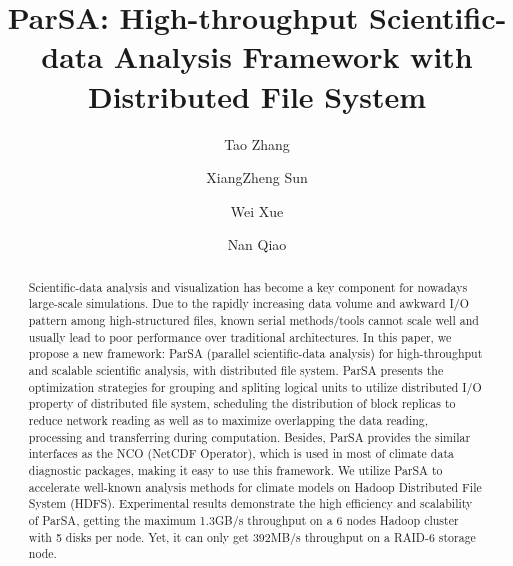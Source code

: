 \documentclass[preprint,12pt]{elsarticle}
\begin{document}
\begin{frontmatter}



\title{ParSA: High-throughput Scientific-data Analysis Framework with Distributed File System}



\author[1]{Tao Zhang}
\author[2]{XiangZheng Sun}
\author[1]{Wei Xue}
\author[2]{Nan Qiao}
\address[1]{Department of Computer Science and Technology, Tsinghua University, Beijing, China}
\address[2]{Intel Corporation, Beijing, China}

\begin{abstract}
Scientific-data analysis and visualization has become a key component for nowadays large-scale simulations. Due to the rapidly
increasing data volume and awkward I/O pattern among high-structured files, known serial methods/tools cannot scale well and 
usually lead to poor performance over traditional architectures. In this paper, we propose a new framework: ParSA 
(parallel scientific-data analysis) for high-throughput and scalable scientific analysis, with distributed file system. ParSA
presents the optimization strategies for grouping and spliting logical units to utilize distributed I/O property of distributed 
file system, scheduling the distribution of block replicas to reduce network reading as well as to maximize overlapping the data reading, 
processing and transferring during computation. Besides, ParSA provides the similar interfaces as the NCO (NetCDF Operator), which is 
used in most of climate data diagnostic packages, making it easy to use this framework. We utilize ParSA to accelerate well-known 
analysis methods for climate models on Hadoop Distributed File System (HDFS). Experimental results demonstrate the high efficiency and 
scalability of ParSA, getting the maximum 1.3GB/s throughput on a 6 nodes Hadoop cluster with 5 disks per node. Yet, it can only get 392MB/s
throughput on a RAID-6 storage node. 
\end{abstract}


\end{frontmatter}
\end{document}
